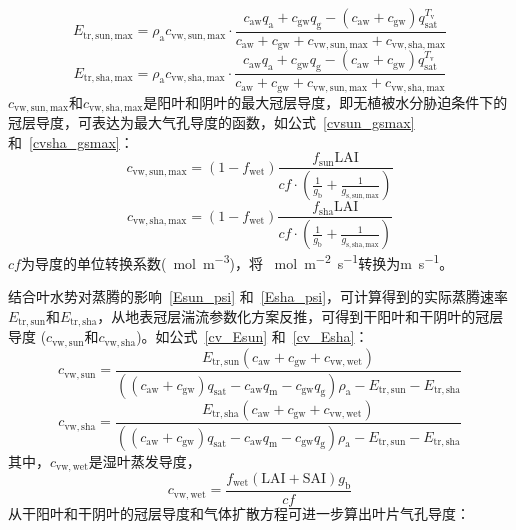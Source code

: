 \begin{equation}\label{E_sunmax}
  E_{\mathrm{tr,sun,max}}=\rho_{\mathrm{a}} c_{\mathrm{vw,sun,max}} \cdot \frac{c_{\mathrm{aw}} q_{\mathrm{a}}+c_{\mathrm{gw}} q_{\mathrm{g}}-
  \left(c_{\mathrm{aw}}+c_{\mathrm{gw}}\right) q_{\mathrm{s a t}}^{T_{\mathrm{v}}}}{c_{\mathrm{aw}}+c_{\mathrm{gw}}+c_{\mathrm{vw,sun,max}}+c_{\mathrm{vw,sha,max}}}
\end{equation}
%
\begin{equation}\label{Eshamax}
  E_{\mathrm{tr,sha,max}}=\rho_{\mathrm{a}} c_{\mathrm{vw,sha,max}} \cdot \frac{c_{\mathrm{aw}} q_{\mathrm{a}}+c_{\mathrm{gw}} q_{\mathrm{g}}-
  \left(c_{\mathrm{aw}}+c_{\mathrm{gw}}\right) q_{\mathrm{s a t}}^{T_{\mathrm{v}}}}{c_{\mathrm{aw}}+c_{\mathrm{gw}}+c_{\mathrm{vw,sun,max}}+c_{\mathrm{vw,sha,max}}}
\end{equation}
%
%
$c_{\mathrm{vw,sun,max}}$和$c_{\mathrm{vw,sha,max}}$是阳叶和阴叶的最大冠层导度，即无植被水分胁迫条件下的冠层导度，可表达为最大气孔导度的函数，如公式~\eqref{cvsun_gsmax} 和~\eqref{cvsha_gsmax}：
\begin{equation}\label{cvsun_gsmax}
  c_{\mathrm{vw,sun,max}}=\left(1-f_{\mathrm{wet}}\right)\frac{f_{\mathrm{sun}}\text{LAI}}{cf\cdot\left(\frac{1}{g_{\mathrm {b}}}+\frac{1}{g_{\mathrm{s,sun,max}}}\right)}
\end{equation}
%
\begin{equation}\label{cvsha_gsmax}
  c_{\mathrm{vw,sha,max}}=\left(1-f_{\mathrm{wet}}\right)\frac{f_{\mathrm{sha}}\text{LAI}}{cf\cdot\left(\frac{1}{g_{\mathrm {b}}}+\frac{1}{g_{\mathrm{s,sha,max}}}\right)}
\end{equation}
$cf$为导度的单位转换系数(\unit{\mu mol.m^{-3}})，将 \unit{\mu mol.m^{-2}.s^{-1}}转换为\unit{m.s^{-1}}。

结合叶水势对蒸腾的影响~\eqref{Esun_psi} 和~\eqref{Esha_psi}，可计算得到的实际蒸腾速率$E_{\mathrm{tr,sun}}$和$E_{\mathrm{tr,sha}}$，从地表冠层湍流参数化方案反推，可得到干阳叶和干阴叶的冠层导度 ($c_{\mathrm{vw,sun}}$和$c_{\mathrm{vw,sha}}$)。如公式~\eqref{cv_Esun} 和~\eqref{cv_Esha}：
\begin{equation}\label{cv_Esun}c_{\mathrm{vw,sun}}=\frac{E_{\mathrm{tr,sun}}\left(c_{\mathrm {aw}}+c_{\mathrm {gw}}+c_{\mathrm{vw,wet}}\right)}{\left(\left(c_{\mathrm {aw}}+c_{\mathrm {gw}}\right)q_{\mathrm{sat}}-c_{\mathrm {aw}} q_{\mathrm {m}} - c_{\mathrm {gw}} q_{\mathrm {g}}\right)\rho_{\mathrm{a}}-E_{\mathrm{tr,sun}}-E_{\mathrm{tr,sha}}}
\end{equation}
%
\begin{equation}\label{cv_Esha}
  c_{\mathrm{vw,sha}}=\frac{E_{\mathrm{tr,sha}}\left(c_{\mathrm {aw}}+c_{\mathrm {gw}}+c_{\mathrm{vw,wet}}\right)}{\left(\left(c_{\mathrm {aw}}+c_{\mathrm {gw}}\right)q_{\mathrm{sat}}-c_{\mathrm {aw}} q_{\mathrm {m}} - c_{\mathrm {gw}} q_{\mathrm {g}}\right)\rho_{\mathrm{a}}-E_{\mathrm{tr,sun}}-E_{\mathrm{tr,sha}}}
\end{equation}
其中，$c_{\mathrm{vw,wet}}$是湿叶蒸发导度，
\begin{equation}\label{cwet}
  c_{\mathrm{vw,wet}}=\frac{f_{\mathrm{wet}}\left(\text{LAI}+\text{SAI}\right)g_{\mathrm {b}}}{cf}
\end{equation}
从干阳叶和干阴叶的冠层导度和气体扩散方程可进一步算出叶片气孔导度：

